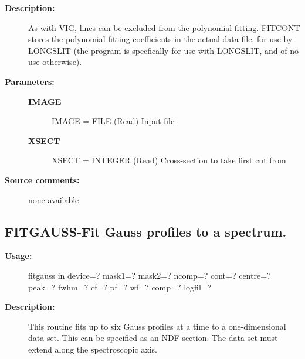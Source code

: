 \begin{description}
\begin{description}
\item [\textbf{Description:}]
   As with VIG, lines can be excluded from the polynomial
   fitting. FITCONT stores the polynomial fitting coefficients in
   the actual data file, for use by LONGSLIT (the program is specfically
   for use with LONGSLIT, and of no use otherwise).

\item [\textbf{Parameters:}]
\begin{description}
\item [\textbf{IMAGE}]
   IMAGE = FILE (Read)
        Input file
\item [\textbf{XSECT}]
   XSECT = INTEGER (Read)
        Cross-section to take first cut from
\end{description}

\item [\textbf{Source comments:}]
\begin{terminalv}
  none available

\end{terminalv}
\end{description}
\subsection{FITGAUSS-\label{FITGAUSS}Fit Gauss profiles to a spectrum.}
\begin{description}

\item [\textbf{Usage:}]

   fitgauss in device=? mask1=? mask2=?
      ncomp=? cont=? centre=? peak=? fwhm=? cf=? pf=? wf=?
      comp=? logfil=?


\item [\textbf{Description:}]
   This routine fits up to six Gauss profiles at a time to a
   one-dimensional data set. This can be specified as an NDF section.
   The data set must extend along the spectroscopic axis.



\end{description}
\end{description}
